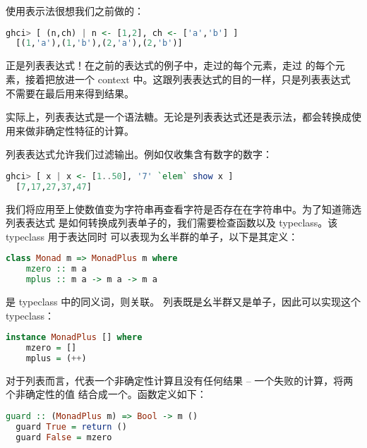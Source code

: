 \documentclass[./main.tex]{subfiles}
\begin{document}
使用表示法很想我们之前做的：

\begin{lstlisting}[language=Haskell]
  ghci> [ (n,ch) | n <- [1,2], ch <- ['a','b'] ]
  [(1,'a'),(1,'b'),(2,'a'),(2,'b')]
\end{lstlisting}

正是列表表达式！在之前的表达式的例子中，走过\acode{[1,2]}的每个元素，走过
\acode{['a','b']}的每个元素，接着把放进一个 context 中。这跟列表表达式的目的一样，只是列表表达式
不需要在最后用来得到结果。

实际上，列表表达式是一个语法糖。无论是列表表达式还是表示法，都会转换成使用\acode{>>=}来做非确定性特征的计算。

列表表达式允许我们过滤输出。例如仅收集含有数字的数字：

\begin{lstlisting}[language=Haskell]
  ghci> [ x | x <- [1..50], '7' `elem` show x ]
  [7,17,27,37,47]
\end{lstlisting}

我们将应用至上使数值变为字符串再查看字符是否存在在字符串中。为了知道筛选列表表达式
是如何转换成列表单子的，我们需要检查函数以及 typeclass。该 typeclass 用于表达同时
可以表现为幺半群的单子，以下是其定义：

\begin{lstlisting}[language=Haskell]
  class Monad m => MonadPlus m where
    mzero :: m a
    mplus :: m a -> m a -> m a
\end{lstlisting}

是 typeclass 中的同义词，则关联。
列表既是幺半群又是单子，因此可以实现这个 typeclass：

\begin{lstlisting}[language=Haskell]
  instance MonadPlus [] where
    mzero = []
    mplus = (++)
\end{lstlisting}

对于列表而言，代表一个非确定性计算且没有任何结果 -- 一个失败的计算，将两个非确定性的值
结合成一个。函数定义如下：

\begin{lstlisting}[language=Haskell]
  guard :: (MonadPlus m) => Bool -> m ()
  guard True = return ()
  guard False = mzero
\end{lstlisting}
\end{document}
